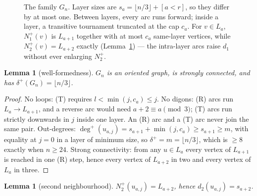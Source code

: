 \documentclass[11pt]{amsart}
\newtheorem{lemma}[theorem]{Lemma}
\theoremstyle{remark}
\begin{document}
\begin{figure}[h]
\centering
{}
\caption{The family $G_n$. Layer sizes are $s_a = \lfloor n/3 \rfloor +
[a < r]$, so they differ by at most one. Between layers, every arc runs
forward; inside a layer, a transitive tournament truncated at the cap $c_a$.
For $v \in L_a$, $N_1^+(v)$ is $L_{a+1}$ together with at most $c_a$
same-layer vertices, while $N_2^+(v) = L_{a+2}$ exactly
(Lemma~\ref{lem:n2}) --- the intra-layer arcs raise $d_1$ without ever
enlarging $N_2^+$.}\label{fig:family}
\end{figure}

\begin{lemma}[well-formedness]\label{lem:wf}
$G_n$ is an oriented graph, is strongly connected, and has
$\delta^+(G_n) = \lfloor n/3 \rfloor$.
\end{lemma}

\begin{proof}
No loops: (T) requires $l < \min(j, c_a) \le j$. No digons: (R) arcs run
$L_a \to L_{a+1}$, and a reverse arc would need $a + 2 \equiv a \pmod 3$;
(T) arcs run strictly downwards in $j$ inside one layer. An (R) arc and a (T)
arc never join the same pair. Out-degrees: $\deg^+(u_{a,j}) = s_{a+1} +
\min(j, c_a) \ge s_{a+1} \ge m$, with equality at $j = 0$ in a layer of
minimum size, so $\delta^+ = m = \lfloor n/3 \rfloor$, which is $\ge 8$
exactly when $n \ge 24$. Strong connectivity: from any $u \in L_a$ every
vertex of $L_{a+1}$ is reached in one (R) step, hence every vertex of
$L_{a+2}$ in two and every vertex of $L_a$ in three.
\end{proof}

\begin{lemma}[second neighbourhood]\label{lem:n2}
$N_2^+(u_{a,j}) = L_{a+2}$, hence $d_2(u_{a,j}) = s_{a+2}$.
\end{lemma}
\end{document}

